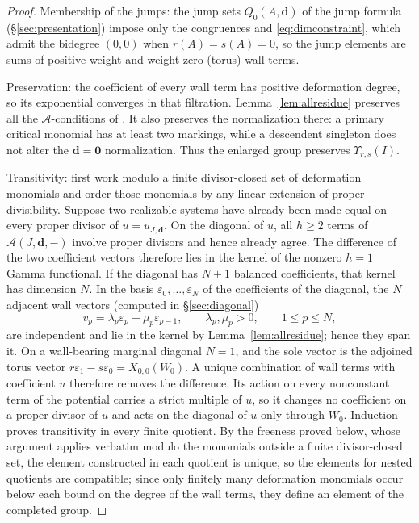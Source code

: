 \documentclass[11pt]{amsart}
\theoremstyle{definition}
\theoremstyle{remark}
\newcommand{\Ascr}{\mathcal{A}}
\begin{document}
\begin{proof}
Membership of the jumps: the jump sets $Q_{0}(A,\mathbf d)$ of the jump
formula (\S\ref{sec:presentation}) impose only the congruences and
\eqref{eq:dimconstraint}, which admit the bidegree $(0,0)$ when
$r(A)=s(A)=0$, so the jump elements are sums of positive-weight and
weight-zero (torus) wall terms.

Preservation: the coefficient of every wall term has positive deformation
degree, so its exponential converges in that filtration.  Lemma~\ref{lem:allresidue}
preserves all the $\Ascr$-conditions of \cite[Def.~3.47]{GKT}.  It also
preserves the normalization there: a primary critical monomial has at least
two markings, while a descendent singleton does not alter the
$\mathbf d=\mathbf0$ normalization.  Thus the enlarged group preserves
$\Upsilon_{r,s}(I)$.

Transitivity: first work modulo a finite divisor-closed set of deformation
monomials and order those monomials by any linear extension of proper
divisibility.  Suppose two realizable systems have already been made equal on
every proper divisor of $u=u_{J,\mathbf d}$.  On the diagonal of $u$, all
$h\ge2$ terms of $\Ascr(J,\mathbf d,-)$ involve proper divisors and hence
already agree.  The difference of the two coefficient vectors therefore lies
in the kernel of the nonzero $h=1$ Gamma functional.  If the diagonal has
$N+1$ balanced coefficients, that kernel has dimension $N$.  In the basis
$\varepsilon_0,\dots,\varepsilon_N$ of the coefficients of the diagonal, the $N$
adjacent wall vectors (computed in \S\ref{sec:diagonal})
\[
 v_p=\lambda_p\varepsilon_p-\mu_p\varepsilon_{p-1},\qquad \lambda_p,\mu_p>0,\qquad 1\le p\le N,
\]
are independent and lie in the kernel by Lemma~\ref{lem:allresidue}; hence
they span it.  On a wall-bearing marginal diagonal $N=1$, and the sole vector is the
adjoined torus vector
$r\varepsilon_1-s\varepsilon_0=X_{0,0}(W_0)$.  A unique combination of
wall terms with coefficient $u$ therefore removes the difference.  Its action
on every nonconstant term of the potential carries a strict multiple of $u$, so
it changes no coefficient on a proper divisor of $u$ and acts on the diagonal
of $u$ only through $W_0$.  Induction proves
transitivity in every finite quotient.  By the freeness proved below, whose
argument applies verbatim modulo the monomials outside a finite
divisor-closed set, the element constructed in each quotient is unique, so
the elements for nested quotients are compatible; since only finitely many
deformation monomials occur below each bound on the degree of the wall terms,
they define an element of the completed group.


\end{proof}
\end{document}
